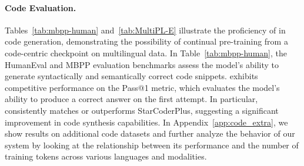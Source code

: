 \begin{table}[!ht]
\centering
{}
\caption{HumanEval \& MBPP evaluation results.}
\label{tab:mbpp-human}
\end{table}


\paragraph{Code Evaluation.}
Tables~\ref{tab:mbpp-human} and~\ref{tab:MultiPL-E} illustrate the proficiency of {\system} in code generation, demonstrating the possibility of continual pre-training from a code-centric checkpoint on multilingual data.
% 
In Table~\ref{tab:mbpp-human}, the HumanEval and MBPP evaluation benchmarks assess the model's ability to generate syntactically and semantically correct code snippets. {\system} exhibits competitive performance on the Pass@1 metric, which evaluates the model's ability to produce a correct answer on the first attempt.  In particular, {\system} consistently matches or outperforms StarCoderPlus, suggesting a significant improvement in code synthesis capabilities.
% 
In Appendix~\ref{app:code_extra}, we show results on additional code datasets and further analyze the behavior of our system by looking at the relationship between its performance and the number of training tokens across various languages and modalities.


